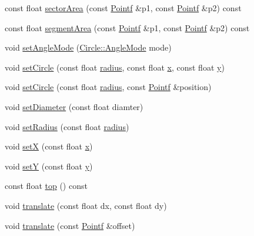 \begin{DoxyCompactItemize}
\item 
const float \hyperlink{classprism_1_1_circle_a0218baa72b2668f116058928c495cf00}{sector\+Area} (const \hyperlink{classprism_1_1_pointf}{Pointf} \&p1, const \hyperlink{classprism_1_1_pointf}{Pointf} \&p2) const 
\item 
const float \hyperlink{classprism_1_1_circle_a454311b6f7a7db3f0cea53971abfdbdc}{segment\+Area} (const \hyperlink{classprism_1_1_pointf}{Pointf} \&p1, const \hyperlink{classprism_1_1_pointf}{Pointf} \&p2) const 
\item 
void \hyperlink{classprism_1_1_circle_a499055061dc996d184dca570ebe8a8ff}{set\+Angle\+Mode} (\hyperlink{classprism_1_1_circle_a74c7c532b4eb120b9227b7fabeffe6ac}{Circle\+::\+Angle\+Mode} mode)
\item 
void \hyperlink{classprism_1_1_circle_a4d04a2dd0e3a9df5ff6a93e5f67ebcb8}{set\+Circle} (const float \hyperlink{classprism_1_1_circle_a75afa2c59f92909d6b6edcec338030fb}{radius}, const float \hyperlink{classprism_1_1_circle_ae1f729f8fa34605123628e67b230b6be}{x}, const float \hyperlink{classprism_1_1_circle_a6edc045d912b0d278bd0673af028290e}{y})
\item 
void \hyperlink{classprism_1_1_circle_a0c5a789447b499bac21009c913974bfc}{set\+Circle} (const float \hyperlink{classprism_1_1_circle_a75afa2c59f92909d6b6edcec338030fb}{radius}, const \hyperlink{classprism_1_1_pointf}{Pointf} \&position)
\item 
void \hyperlink{classprism_1_1_circle_a170c17969d402d01ace2b756c2eec16b}{set\+Diameter} (const float diamter)
\item 
void \hyperlink{classprism_1_1_circle_ad32152033f280f8c32aebf6791c59fcd}{set\+Radius} (const float \hyperlink{classprism_1_1_circle_a75afa2c59f92909d6b6edcec338030fb}{radius})
\item 
void \hyperlink{classprism_1_1_circle_a9f584b9f7d780975557d6293b18cc051}{setX} (const float \hyperlink{classprism_1_1_circle_ae1f729f8fa34605123628e67b230b6be}{x})
\item 
void \hyperlink{classprism_1_1_circle_add9bf882d06da81faa8063c9a3fec8ae}{setY} (const float \hyperlink{classprism_1_1_circle_a6edc045d912b0d278bd0673af028290e}{y})
\item 
const float \hyperlink{classprism_1_1_circle_a2c1851a017d5379d8ddf2a80d7bd1b1b}{top} () const 
\item 
void \hyperlink{classprism_1_1_circle_ab11cd4ad2acffd0b55989c32a04a8e2d}{translate} (const float dx, const float dy)
\item 
void \hyperlink{classprism_1_1_circle_a067a3baa023abff5e033b04efffe9f3b}{translate} (const \hyperlink{classprism_1_1_pointf}{Pointf} \&offset)

\end{DoxyCompactItemize}

